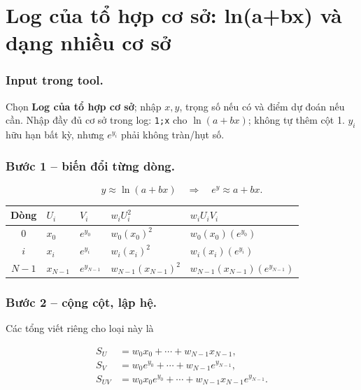 \examplebreak
\section{Log của tổ hợp cơ sở: ln(a+bx) và dạng nhiều cơ sở}

\label{sec:ls-log-combination}

\subsubsection*{Input trong tool.} Chọn \textbf{Log của tổ hợp cơ sở}; nhập $x,y$, trọng số nếu có và điểm dự đoán nếu cần. Nhập đầy đủ cơ sở trong log: \texttt{1;x} cho $\ln(a+bx)$; không tự thêm cột 1. $y_i$ hữu hạn bất kỳ, nhưng $e^{y_i}$ phải không tràn/hụt số.

\subsubsection*{Bước 1 -- biến đổi từng dòng.}\[y\approx\ln(a+bx)\quad\Longrightarrow\quad e^y\approx a+bx.\]

\begin{center}\small\begin{tabular}{cllll}\toprule

Dòng&$U_i$&$V_i$&$w_iU_i^2$&$w_iU_iV_i$\\\midrule

$0$&$x_0$&$e^{y_0}$&$w_{0}(x_0)^2$&$w_{0}(x_0)(e^{y_0})$\\

$i$&$x_{i}$&$e^{y_{i}}$&$w_{i}(x_{i})^2$&$w_{i}(x_{i})(e^{y_{i}})$\\

$N-1$&$x_{N-1}$&$e^{y_{N-1}}$&$w_{N-1}(x_{N-1})^2$&$w_{N-1}(x_{N-1})(e^{y_{N-1}})$\\

\bottomrule\end{tabular}\end{center}

\subsubsection*{Bước 2 -- cộng cột, lập hệ.} Các tổng viết riêng cho loại này là

\begin{align*}S_U&=w_0x_0+\cdots+w_{N-1}x_{N-1},\\S_V&=w_0e^{y_0}+\cdots+w_{N-1}e^{y_{N-1}},\\S_{UV}&=w_0x_0e^{y_0}+\cdots+w_{N-1}x_{N-1}e^{y_{N-1}}.\end{align*}

